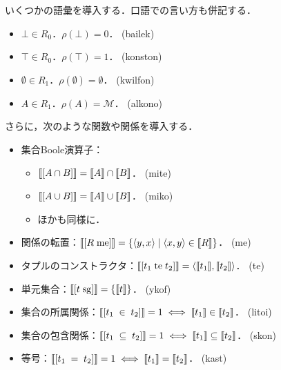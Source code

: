 \documentclass[../../main-detail.tex]{subfiles}
\begin{document}
\begin{definition} いくつかの語彙を導入する．口語での言い方も併記する．
    \leavevmode
    \begin{itemize}
        \item $\bot \in R_0$．$\rho(\bot) = 0$．\hspace{1em} (bailek)
        \item $\top \in R_0$．$\rho(\top) = 1$．\hspace{1em} (konston)
        \item $\emptyset \in R_1$．$\rho(\emptyset) = \emptyset$．\hspace{1em} (kwilfon)
        \item $A \in R_1$．$\rho(A) = \mathcal{M}$．\hspace{1em} (alkono)
    \end{itemize}
    さらに，次のような関数や関係を導入する．
    \begin{itemize}
        \item 集合Boole演算子：
        \begin{itemize}
            \item $\llbracket [A \cap B] \rrbracket = \llbracket A \rrbracket \cap \llbracket B \rrbracket$．\hspace{1em} (mite)
            \item $\llbracket [A \cup B] \rrbracket = \llbracket A \rrbracket \cup \llbracket B \rrbracket$．\hspace{1em} (miko)
            \item ほかも同様に．
        \end{itemize}
        \item 関係の転置：$\llbracket [R\; \mathrm{me}] \rrbracket = \{\langle y, x\rangle \mid \langle x, y\rangle \in \llbracket R \rrbracket\}$．\hspace{1em} (me)
        \item タプルのコンストラクタ：$\llbracket [t_1\; \mathrm{te}\; t_2] \rrbracket = \langle \llbracket t_1 \rrbracket, \llbracket t_2 \rrbracket \rangle$．\hspace{1em} (te)
        \item 単元集合：$\llbracket [t\; \mathrm{sg}] \rrbracket = \{\llbracket t \rrbracket\}$．\hspace{1em} (ykof)
        \item 集合の所属関係：$\llbracket [t_1\; \in\; t_2] \rrbracket = 1 \iff \llbracket t_1 \rrbracket \in \llbracket t_2 \rrbracket$．\hspace{1em} (litoi)
        \item 集合の包含関係：$\llbracket [t_1\; \subseteq\; t_2] \rrbracket = 1 \iff \llbracket t_1 \rrbracket \subseteq \llbracket t_2 \rrbracket$．\hspace{1em} (skon)
        \item 等号：$\llbracket [t_1\; =\; t_2] \rrbracket = 1 \iff \llbracket t_1 \rrbracket = \llbracket t_2 \rrbracket$．\hspace{1em} (kast)
    \end{itemize}
\end{definition}
\end{document}

